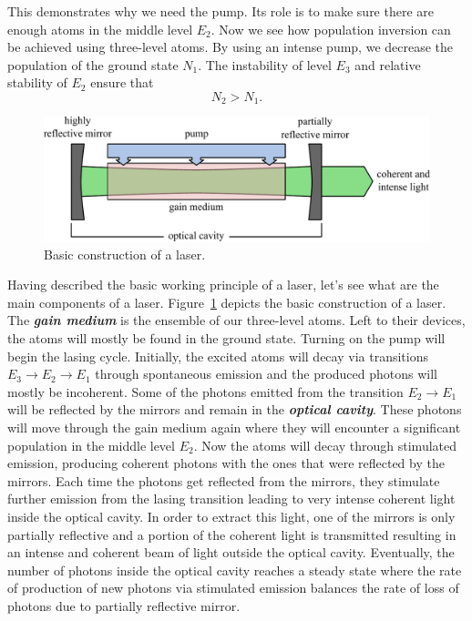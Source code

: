 This demonstrates why we need the pump.
Its role is to make sure there are enough atoms in the middle level $E_2$.
Now we see how population inversion can be achieved using three-level atoms.
By using an intense pump, we decrease the population of the ground state $N_1$.
The instability of level $E_3$ and relative stability of $E_2$ ensure that
\begin{equation}
    N_2 > N_1.
\end{equation}

\begin{figure}[t]
    \centering
    \includegraphics[width=\textwidth]{lesson5/5-4_laser construction.pdf}
    \caption[Laser construction]{Basic construction of a laser.}
    \label{fig:5-4_laser_construction}
\end{figure}

Having described the basic working principle of a laser, let's see what are the main components of a laser.
Figure~\ref{fig:5-4_laser_construction} depicts the basic construction of a laser.
The \textit{\textbf{gain medium}} is the ensemble of our three-level atoms.
Left to their devices, the atoms will mostly be found in the ground state.
Turning on the pump will begin the lasing cycle.
Initially, the excited atoms will decay via transitions $E_3 \rightarrow E_2 \rightarrow E_1$ through spontaneous emission and the produced photons will mostly be incoherent.
Some of the photons emitted from the transition $E_2 \rightarrow E_1$ will be reflected by the mirrors and remain in the \textit{\textbf{optical cavity}}.
These photons will move through the gain medium again where they will encounter a significant population in the middle level $E_2$.
Now the atoms will decay through stimulated emission, producing coherent photons with the ones that were reflected by the mirrors.
Each time the photons get reflected from the mirrors, they stimulate further emission from the lasing transition leading to very intense coherent light inside the optical cavity.
In order to extract this light, one of the mirrors is only partially reflective and a portion of the coherent light is transmitted resulting in an intense and coherent beam of light outside the optical cavity.
Eventually, the number of photons inside the optical cavity reaches a steady state where the rate of production of new photons via stimulated emission balances the rate of loss of photons due to partially reflective mirror.

